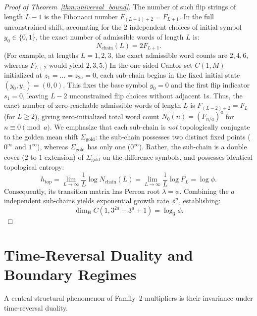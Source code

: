 \documentclass[11pt,reqno]{amsart}
\theoremstyle{plain}
\theoremstyle{definition}
\theoremstyle{remark}
\newcommand{\dimH}{\dim_{\mathrm{H}}}
\begin{document}
\begin{proof}[Proof of Theorem~\ref{thm:universal_bound}]
The number of such flip strings of length $L-1$ is the Fibonacci number $F_{(L-1)+2} = F_{L+1}$. In the full unconstrained shift, accounting for the $2$ independent choices of initial symbol $y_0 \in \{0, 1\}$, the exact number of admissible words of length $L$ is:
\begin{equation}
N_{\mathrm{chain}}(L) = 2 F_{L+1}.
\end{equation}
(For example, at lengths $L=1, 2, 3$, the exact admissible word counts are $2, 4, 6$, whereas $F_{L+2}$ would yield $2, 3, 5$.)
In the one-sided Cantor set $C(1, M)$ initialized at $z_1 = \dots = z_{2a} = 0$, each sub-chain begins in the fixed initial state $(y_0, y_1) = (0, 0)$. This fixes the base symbol $y_0 = 0$ and the first flip indicator $s_1 = 0$, leaving $L - 2$ unconstrained flip choices without adjacent $1$s. Thus, the exact number of zero-reachable admissible words of length $L$ is $F_{(L-2)+2} = F_L$ (for $L \ge 2$), giving zero-initialized total word count $N_0(n) = (F_{n/a})^a$ for $n \equiv 0 \pmod a$.
We emphasize that each sub-chain is \emph{not} topologically conjugate to the golden mean shift $\Sigma_{\mathrm{gold}}$: the sub-chain possesses two distinct fixed points ($0^\infty$ and $1^\infty$), whereas $\Sigma_{\mathrm{gold}}$ has only one ($0^\infty$). Rather, the sub-chain is a double cover ($2$-to-$1$ extension) of $\Sigma_{\mathrm{gold}}$ on the difference symbols, and possesses identical topological entropy:
\begin{equation}
h_{\mathrm{top}} = \lim_{L \to \infty} \frac{1}{L} \log N_{\mathrm{chain}}(L) = \lim_{L \to \infty} \frac{1}{L} \log F_L = \log \phi.
\end{equation}
Consequently, its transition matrix has Perron root $\lambda = \phi$. Combining the $a$ independent sub-chains yields exponential growth rate $\phi^n$, establishing:
\begin{equation}
\dimH C(1, 3^{2a} - 3^a + 1) = \log_3 \phi.
\end{equation}
\end{proof}

\section{Time-Reversal Duality and Boundary Regimes}

A central structural phenomenon of Family~2 multipliers is their invariance under time-reversal duality.
\end{document}
